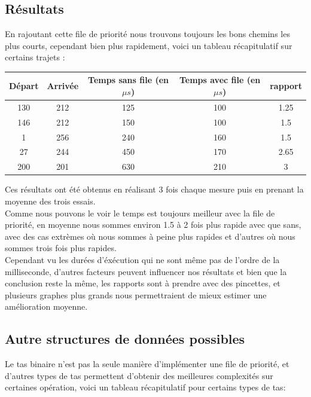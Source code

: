 \documentclass{article}
\begin{document}
\subsection{Résultats}

En rajoutant cette file de priorité nous trouvons toujours les bons chemins les plus courts, cependant
bien plus rapidement, voici un tableau récapitulatif sur certains trajets :\\

\begin{center}
\begin{tabular}{| c | c | c | c | c |}
	\hline
	 Départ & Arrivée & Temps sans file (en $\mu s$)& Temps avec file (en $\mu s$) & rapport \\ \hline
	 130 & 212 & 125 & 100 & 1.25 \\ \hline
	 146 & 212 & 150 & 100 & 1.5 \\ \hline
	 1 & 256 & 240 & 160 & 1.5\\ \hline
	 27 & 244 & 450 & 170 & 2.65\\ \hline
	 200 & 201 & 630 & 210 & 3 \\ \hline
\end{tabular}
\end{center}

Ces résultats ont été obtenus en réalisant 3 fois chaque mesure puis en prenant la moyenne des
trois essais.\\

Comme nous pouvons le voir le temps est toujours meilleur avec la file de priorité, en moyenne nous
sommes environ 1.5 à 2 fois plus rapide avec que sans, avec des cas extrèmes où nous sommes à peine plus
rapides et d'autres où nous sommes trois fois plus rapides.\\

Cependant vu les durées d'éxécution qui ne sont même pas de l'ordre de la milliseconde, d'autres facteurs
peuvent influencer nos résultats et bien que la conclusion reste la même, les rapports sont à prendre
avec des pincettes, et plusieurs graphes plus grands nous permettraient de mieux estimer une amélioration
moyenne.

\subsection{Autre structures de données possibles}

Le tas binaire n'est pas la seule manière d'implémenter une file de priorité, et d'autres types
de tas permettent d'obtenir des meilleures complexités sur certaines opération, voici
un tableau récapitulatif pour certains types de tas:
\end{document}
